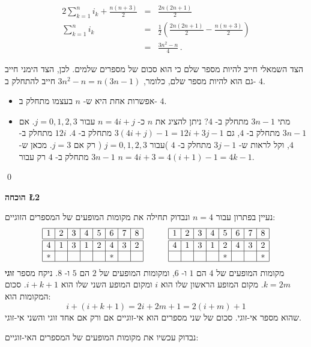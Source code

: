 \begin{eqnarray*}
2\sum_{k=1}^{n}i_k+\frac{n(n+3)}{2} &=& \frac{2n(2n+1)}{2}\\
\sum_{k=1}^{n}i_k &=& \frac{1}{2}\left(\frac{2n(2n+1)}{2} - \frac{n(n+3)}{2}\right) \\
&=& \frac{3n^2-n}{4}\,.
\end{eqnarray*}

הצד השמאלי חייב להיות מספר שלם כי הוא סכום של מספרים שלמים. לכן, הצד הימני חייב גם הוא להיות מספר שלם, כלומר,
$3n^2-n=n(3n-1)$
חייב להתחלק ב-%
$4$.
\begin{itemize}
\item
אפשרות אחת היא ש-%
$n$
בעצמו מתחלק ב-%
$4$.
\item

מתי 
$3n-1$
מתחלק ב-%
$4$?
ניתן להציג את
$n$
כ-%
$n=4i+j$
עבור
$j=0,1,2,3$.
אם 
$3n-1$
מתחלק ב-%
$4$,
גם
$3(4i+j)-1 = 12i+3j-1$
מתחלק ב-%
$4$.
$12i$
מתחלק ב-%
$4$,
וקל לראות ש-%
$3j-1$
מתחלק ב-%
$4$
)עבור 
$j=0,1,2,3$%
( רק אם
$j=3$.
מכאן ש-%
$3n-1$
מתחלק ב-%
$4$
רק עבור
$n=4i+3=4(i+1)-1=4k-1$.
\end{itemize}
\qed



\textbf{הוכחה
\L{2}}


נעיין בפתרון עבור
$n=4$
ונבדוק תחילה את מקומות המופעים של המספרים הזוגיים:
\[
\begin{array}{|c|c|c|c|c|c|c|c|}
\hline
1&2&3&4&5&6&7&8\\
\hline\hline
4&1&3&1&2&4&3&2\\\hline
*&&&&&*&&\\\hline
\end{array}
\hspace{3em}
\begin{array}{|c|c|c|c|c|c|c|c|}
\hline
1&2&3&4&5&6&7&8\\
\hline\hline
4&1&3&1&2&4&3&2\\\hline
&&&&*&&&*\\\hline
\end{array}
\]
מקומות המופעים של
$4$
הם
$1$
ו-%
$6$,
ומקומות המופעים של
$2$
הם
$5$
ו-%
$8$.
ניקח מספר
\textbf{זוגי}
$k=2m$. 
מקום המופע הראשון שלו הוא
$i$
ומקום המופע השני שלו הוא
$i+k+1$.
סכום המקומות הוא:
\[
i+(i+k+1)=2i+2m+1=2(i+m)+1
\]
שהוא מספר אי-זוגי.
סכום של שני מספרים הוא אי-זוגיים אם ורק אם אחד זוגי והשני אי-זוגי.

נבדוק עכשיו את מקומות המופעים של המספרים האי-זוגיים:

